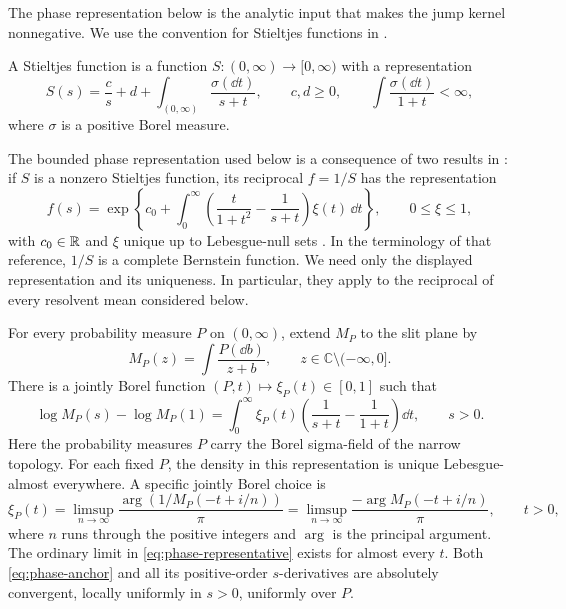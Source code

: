 The phase representation below is the analytic input that makes the jump kernel nonnegative.
We use the convention for Stieltjes functions in \cite[Chapter~2]{SSV2010}.

\begin{definition}
\label{def:stieltjes}
A Stieltjes function is a function \(S:(0,\infty)\to[0,\infty)\) with a representation
\[
  S(s)=\frac{c}{s}+d+\int_{(0,\infty)}
                         \frac{\sigma(\dd t)}{s+t},
  \qquad c,d\ge0,\qquad
  \int\frac{\sigma(\dd t)}{1+t}<\infty,
\]
where \(\sigma\) is a positive Borel measure.
\end{definition}

The bounded phase representation used below is a consequence of two results in \citet[Theorems~6.10 and~7.3]{SSV2010}: if \(S\) is a nonzero Stieltjes function, its reciprocal \(f=1/S\) has the representation
\begin{equation}\label{eq:ssv-exponential}
  f(s)=\exp\left\{c_0+\int_0^\infty
     \left(\frac{t}{1+t^2}-\frac1{s+t}\right)
                           \xi(t)\,\dd t\right\},
  \qquad 0\le\xi\le1,
\end{equation}
with \(c_0\in\mathbb R\) and \(\xi\) unique up to Lebesgue-null sets \cite[Theorem~6.10, pp.~58--59, and Theorem~7.3, p.~63]{SSV2010}.
In the terminology of that reference, \(1/S\) is a complete Bernstein function.
We need only the displayed representation and its uniqueness.
In particular, they apply to the reciprocal of every resolvent mean considered below.

\begin{lemma}
\label{lem:phase}
For every probability measure \(P\) on \((0,\infty)\), extend \(M_P\) to the slit plane by
\[
  M_P(z)=\int\frac{P(\dd b)}{z+b},
  \qquad z\in\mathbb C\setminus(-\infty,0].
\]
There is a jointly Borel function \((P,t)\mapsto\xi_P(t)\in[0,1]\) such that
\begin{equation}\label{eq:phase-anchor}
  \log M_P(s)-\log M_P(1)
  =\int_0^\infty\xi_P(t)
       \left(\frac1{s+t}-\frac1{1+t}\right)\dd t,
  \qquad s>0.
\end{equation}
Here the probability measures \(P\) carry the Borel sigma-field of the narrow topology.
For each fixed \(P\), the density in this representation is unique Lebesgue-almost everywhere.
A specific jointly Borel choice is
\begin{equation}\label{eq:phase-representative}
  \xi_P(t)=\limsup_{n\to\infty}
       \frac{\arg(1/M_P(-t+i/n))}{\pi}
       =\limsup_{n\to\infty}
       \frac{-\arg M_P(-t+i/n)}{\pi},\qquad t>0,
\end{equation}
where \(n\) runs through the positive integers and \(\arg\) is the principal argument.
The ordinary limit in \eqref{eq:phase-representative} exists for almost every \(t\).
Both \eqref{eq:phase-anchor} and all its positive-order \(s\)-derivatives are absolutely convergent, locally uniformly in \(s>0\), uniformly over \(P\).
\end{lemma}

